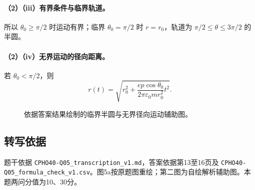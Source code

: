 \paragraph{（2）（iii）有界条件与临界轨道。}
所以 $\theta_0\ge\pi/2$ 时运动有界；临界 $\theta_0=\pi/2$ 时 $r=r_0$，轨道为 $\pi/2\le\theta\le3\pi/2$ 的半圆。
\paragraph{（2）（iv）无界运动的径向距离。}
若 $\theta_0<\pi/2$，则
\[\boxed{r(t)=\sqrt{r_0^2+\frac{ep\cos\theta_0}{2\pi\varepsilon_0mr_0^2}t^2}}.\]
\begin{figure}[htbp]\centering\caption{依据答案结果绘制的临界半圆与无界径向运动辅助图。}\end{figure}
\subsection{转写依据}
题干依据 \texttt{CPHO40-Q05\_transcription\_v1.md}，答案依据第13至16页及 \texttt{CPHO40-Q05\_formula\_check\_v1.csv}。图5a按原题图重绘；第二图为自绘解析辅助图。本题两问分值为10、30分。
